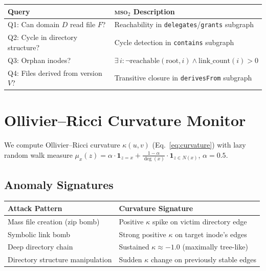 \documentclass[11pt,a4paper]{article}
\theoremstyle{definition}
\newcommand{\MSO}{\textsc{mso}}
\begin{document}
\begin{center}
\footnotesize
\begin{tabularx}{\textwidth}{lX}
\toprule
\textbf{Query} & \textbf{\MSO{}$_2$ Description} \\
\midrule
Q1: Can domain $D$ read file $F$? & Reachability in \texttt{delegates}/\texttt{grants} subgraph \\
Q2: Cycle in directory structure? & Cycle detection in \texttt{contains} subgraph \\
Q3: Orphan inodes? & $\exists\, i\colon \neg\mathrm{reachable}(\mathrm{root}, i) \land \mathrm{link\_count}(i) > 0$ \\
Q4: Files derived from version $V$? & Transitive closure in \texttt{derivesFrom} subgraph \\
\bottomrule
\end{tabularx}
\end{center}

\section{Ollivier--Ricci Curvature Monitor}\label{sec:curvature}

We compute Ollivier--Ricci curvature $\kappa(u,v)$
(Eq.~\ref{eq:curvature}) with lazy random walk measure
$\mu_x(z) = \alpha \cdot \mathbf{1}_{z=x} + \frac{1-\alpha}{\deg(x)} \cdot
\mathbf{1}_{z \in N(x)}$, $\alpha = 0.5$.

\subsection{Anomaly Signatures}

\begin{center}
\footnotesize
\begin{tabularx}{\textwidth}{lX}
\toprule
\textbf{Attack Pattern} & \textbf{Curvature Signature} \\
\midrule
Mass file creation (zip bomb) & Positive $\kappa$ spike on victim directory edge \\
Symbolic link bomb & Strong positive $\kappa$ on target inode's edges \\
Deep directory chain & Sustained $\kappa \approx -1.0$ (maximally tree-like) \\
Directory structure manipulation & Sudden $\kappa$ change on previously stable edges \\
\bottomrule
\end{tabularx}
\end{center}
\end{document}
